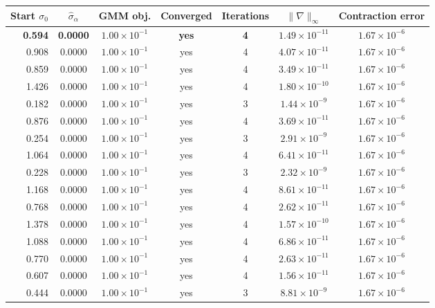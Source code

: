 \begin{tabular}{rcccccc}
\toprule
Start $\sigma_0$ & $\hat\sigma_\alpha$ & GMM obj. & Converged & Iterations & $\|\nabla\|_\infty$ & Contraction error \\
\midrule
\textbf{0.594} & \textbf{0.0000} & \textbf{$1.00\times10^{-1}$} & \textbf{yes} & \textbf{4} & \textbf{$1.49\times10^{-11}$} & \textbf{$1.67\times10^{-6}$} \\
0.908 & 0.0000 & $1.00\times10^{-1}$ & yes & 4 & $4.07\times10^{-11}$ & $1.67\times10^{-6}$ \\
0.859 & 0.0000 & $1.00\times10^{-1}$ & yes & 4 & $3.49\times10^{-11}$ & $1.67\times10^{-6}$ \\
1.426 & 0.0000 & $1.00\times10^{-1}$ & yes & 4 & $1.80\times10^{-10}$ & $1.67\times10^{-6}$ \\
0.182 & 0.0000 & $1.00\times10^{-1}$ & yes & 3 & $1.44\times10^{-9}$ & $1.67\times10^{-6}$ \\
0.876 & 0.0000 & $1.00\times10^{-1}$ & yes & 4 & $3.69\times10^{-11}$ & $1.67\times10^{-6}$ \\
0.254 & 0.0000 & $1.00\times10^{-1}$ & yes & 3 & $2.91\times10^{-9}$ & $1.67\times10^{-6}$ \\
1.064 & 0.0000 & $1.00\times10^{-1}$ & yes & 4 & $6.41\times10^{-11}$ & $1.67\times10^{-6}$ \\
0.228 & 0.0000 & $1.00\times10^{-1}$ & yes & 3 & $2.32\times10^{-9}$ & $1.67\times10^{-6}$ \\
1.168 & 0.0000 & $1.00\times10^{-1}$ & yes & 4 & $8.61\times10^{-11}$ & $1.67\times10^{-6}$ \\
0.768 & 0.0000 & $1.00\times10^{-1}$ & yes & 4 & $2.62\times10^{-11}$ & $1.67\times10^{-6}$ \\
1.378 & 0.0000 & $1.00\times10^{-1}$ & yes & 4 & $1.57\times10^{-10}$ & $1.67\times10^{-6}$ \\
1.088 & 0.0000 & $1.00\times10^{-1}$ & yes & 4 & $6.86\times10^{-11}$ & $1.67\times10^{-6}$ \\
0.770 & 0.0000 & $1.00\times10^{-1}$ & yes & 4 & $2.63\times10^{-11}$ & $1.67\times10^{-6}$ \\
0.607 & 0.0000 & $1.00\times10^{-1}$ & yes & 4 & $1.56\times10^{-11}$ & $1.67\times10^{-6}$ \\
0.444 & 0.0000 & $1.00\times10^{-1}$ & yes & 3 & $8.81\times10^{-9}$ & $1.67\times10^{-6}$ \\
\bottomrule
\end{tabular}
